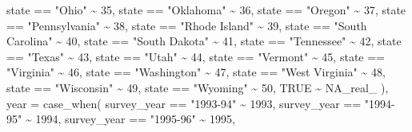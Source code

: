 \documentclass[
  letterpaper,
  DIV=11,
  numbers=noendperiod]{scrartcl}
\newenvironment{Shaded}{\begin{snugshade}}{\end{snugshade}}
\newcommand{\AttributeTok}[1]{\textcolor[rgb]{0.40,0.45,0.13}{#1}}
\newcommand{\ConstantTok}[1]{\textcolor[rgb]{0.56,0.35,0.01}{#1}}
\newcommand{\DecValTok}[1]{\textcolor[rgb]{0.68,0.00,0.00}{#1}}
\newcommand{\FunctionTok}[1]{\textcolor[rgb]{0.28,0.35,0.67}{#1}}
\newcommand{\NormalTok}[1]{\textcolor[rgb]{0.00,0.23,0.31}{#1}}
\newcommand{\SpecialCharTok}[1]{\textcolor[rgb]{0.37,0.37,0.37}{#1}}
\newcommand{\StringTok}[1]{\textcolor[rgb]{0.13,0.47,0.30}{#1}}
\begin{document}
\begin{Shaded}
\begin{Highlighting}[]
\NormalTok{      state }\SpecialCharTok{==} \StringTok{"Ohio"} \SpecialCharTok{\textasciitilde{}} \DecValTok{35}\NormalTok{,}
\NormalTok{      state }\SpecialCharTok{==} \StringTok{"Oklahoma"} \SpecialCharTok{\textasciitilde{}} \DecValTok{36}\NormalTok{,}
\NormalTok{      state }\SpecialCharTok{==} \StringTok{"Oregon"} \SpecialCharTok{\textasciitilde{}} \DecValTok{37}\NormalTok{,}
\NormalTok{      state }\SpecialCharTok{==} \StringTok{"Pennsylvania"} \SpecialCharTok{\textasciitilde{}} \DecValTok{38}\NormalTok{,}
\NormalTok{      state }\SpecialCharTok{==} \StringTok{"Rhode Island"} \SpecialCharTok{\textasciitilde{}} \DecValTok{39}\NormalTok{,}
\NormalTok{      state }\SpecialCharTok{==} \StringTok{"South Carolina"} \SpecialCharTok{\textasciitilde{}} \DecValTok{40}\NormalTok{,}
\NormalTok{      state }\SpecialCharTok{==} \StringTok{"South Dakota"} \SpecialCharTok{\textasciitilde{}} \DecValTok{41}\NormalTok{,}
\NormalTok{      state }\SpecialCharTok{==} \StringTok{"Tennessee"} \SpecialCharTok{\textasciitilde{}} \DecValTok{42}\NormalTok{,}
\NormalTok{      state }\SpecialCharTok{==} \StringTok{"Texas"} \SpecialCharTok{\textasciitilde{}} \DecValTok{43}\NormalTok{,}
\NormalTok{      state }\SpecialCharTok{==} \StringTok{"Utah"} \SpecialCharTok{\textasciitilde{}} \DecValTok{44}\NormalTok{,}
\NormalTok{      state }\SpecialCharTok{==} \StringTok{"Vermont"} \SpecialCharTok{\textasciitilde{}} \DecValTok{45}\NormalTok{,}
\NormalTok{      state }\SpecialCharTok{==} \StringTok{"Virginia"} \SpecialCharTok{\textasciitilde{}} \DecValTok{46}\NormalTok{,}
\NormalTok{      state }\SpecialCharTok{==} \StringTok{"Washington"} \SpecialCharTok{\textasciitilde{}} \DecValTok{47}\NormalTok{,}
\NormalTok{      state }\SpecialCharTok{==} \StringTok{"West Virginia"} \SpecialCharTok{\textasciitilde{}} \DecValTok{48}\NormalTok{,}
\NormalTok{      state }\SpecialCharTok{==} \StringTok{"Wisconsin"} \SpecialCharTok{\textasciitilde{}} \DecValTok{49}\NormalTok{,}
\NormalTok{      state }\SpecialCharTok{==} \StringTok{"Wyoming"} \SpecialCharTok{\textasciitilde{}} \DecValTok{50}\NormalTok{,}
      \ConstantTok{TRUE} \SpecialCharTok{\textasciitilde{}} \ConstantTok{NA\_real\_}
\NormalTok{    ),}
    \AttributeTok{year =} \FunctionTok{case\_when}\NormalTok{(}
\NormalTok{      survey\_year }\SpecialCharTok{==} \StringTok{"1993{-}94"} \SpecialCharTok{\textasciitilde{}} \DecValTok{1993}\NormalTok{,}
\NormalTok{      survey\_year }\SpecialCharTok{==} \StringTok{"1994{-}95"} \SpecialCharTok{\textasciitilde{}} \DecValTok{1994}\NormalTok{,}
\NormalTok{      survey\_year }\SpecialCharTok{==} \StringTok{"1995{-}96"} \SpecialCharTok{\textasciitilde{}} \DecValTok{1995}\NormalTok{,}

\end{Highlighting}
\end{Shaded}
\end{document}
